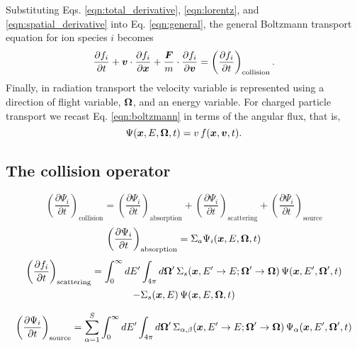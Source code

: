 Substituting Eqs. \eqref{eqn:total_derivative}, \eqref{eqn:lorentz}, and \eqref{eqn:spatial_derivative} into Eq. \eqref{eqn:general}, the general Boltzmann transport equation for ion species $i$ becomes
\begin{equation} \label{eqn:boltzmann}
  \dfrac{\partial f_i}{\partial t} + \boldsymbol{v} \cdot \dfrac{\partial f_i}{\partial \boldsymbol{x}} + \dfrac{\boldsymbol{F}}{m} \cdot \dfrac{\partial f_i}{\partial \boldsymbol{v}} = \left( \dfrac{\partial f_i}{\partial t} \right)_{\text{collision}}.
\end{equation}
Finally, in radiation transport the velocity variable is represented using a direction of flight variable, $\boldsymbol{\Omega}$, and an energy variable. For charged particle transport we recast Eq. \eqref{eqn:boltzmann} in terms of the angular flux, that is,
\begin{equation}
  \Psi(\boldsymbol{x},E,\boldsymbol{\Omega},t) = v \, f(\boldsymbol{x},\boldsymbol{v},t).
\end{equation}


\subsection{The collision operator}
\begin{equation}
  \left( \dfrac{\partial \Psi_i}{\partial t} \right)_{\text{collision}} = \left( \dfrac{\partial \Psi_i}{\partial t} \right)_{\text{absorption}} + \left( \dfrac{\partial \Psi_i}{\partial t} \right)_{\text{scattering}} + \left( \dfrac{\partial \Psi_i}{\partial t} \right)_{\text{source}}
\end{equation}
\begin{equation}
  \left( \dfrac{\partial \Psi_i}{\partial t} \right)_{\text{absorption}} = \Sigma_a \Psi_i(\boldsymbol{x},E,\boldsymbol{\Omega},t)
\end{equation}
\begin{multline}
  \left( \dfrac{\partial f_i}{\partial t} \right)_{\text{scattering}} = \int_{0}^{\infty} dE^{\prime} \int_{4\pi} d \boldsymbol{\Omega}^{\prime} \, \Sigma_s(\boldsymbol{x}, E^{\prime}\rightarrow E; \boldsymbol{\Omega}^{\prime} \rightarrow \boldsymbol{\Omega}) \, \Psi(\boldsymbol{x},E^{\prime},\boldsymbol{\Omega}^{\prime},t) \\
  - \Sigma_s(\boldsymbol{x},E) \, \Psi(\boldsymbol{x},E,\boldsymbol{\Omega},t)
\end{multline}

\begin{equation}
  \left( \dfrac{\partial \Psi_i}{\partial t} \right)_{\text{source}} = \sum_{\alpha=1}^S\int_{0}^{\infty} dE^{\prime} \int_{4\pi} d \boldsymbol{\Omega}^{\prime} \, \Sigma_{\alpha,\beta}(\boldsymbol{x}, E^{\prime}\rightarrow E; \boldsymbol{\Omega}^{\prime} \rightarrow \boldsymbol{\Omega}) \, \Psi_{\alpha}(\boldsymbol{x},E^{\prime},\boldsymbol{\Omega}^{\prime},t)
\end{equation}

